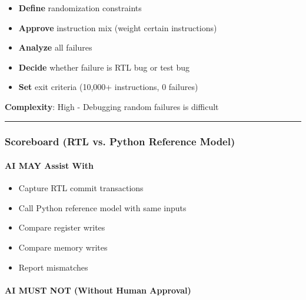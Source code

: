 \begin{record}

\begin{itemize}
\tightlist
\item
  \textbf{Define} randomization constraints
\item
  \textbf{Approve} instruction mix (weight certain instructions)
\item
  \textbf{Analyze} all failures
\item
  \textbf{Decide} whether failure is RTL bug or test bug
\item
  \textbf{Set} exit criteria (10,000+ instructions, 0 failures)
\end{itemize}

\textbf{Complexity}: \bad{} High - Debugging random failures is
difficult

\begin{center}\rule{0.5\linewidth}{0.5pt}\end{center}

\end{record}

\subsubsection{Scoreboard (RTL vs. Python Reference Model)}\label{cr:status:phase1-ai-human-responsibilities:scoreboard-rtl-vs-python-reference-model}

\paragraph{\texorpdfstring{\ok{} AI MAY Assist
With}{ AI MAY Assist With}}\label{cr:status:phase1-ai-human-responsibilities:white-check-mark-ai-may-assist-with-13}

\begin{record}

\begin{itemize}
\tightlist
\item
  Capture RTL commit transactions
\item
  Call Python reference model with same inputs
\item
  Compare register writes
\item
  Compare memory writes
\item
  Report mismatches
\end{itemize}

\end{record}

\paragraph{\texorpdfstring{\warn{} AI MUST NOT (Without Human
Approval)}{ AI MUST NOT (Without Human Approval)}}\label{cr:status:phase1-ai-human-responsibilities:warning-ai-must-not-without-human-approval-13}

